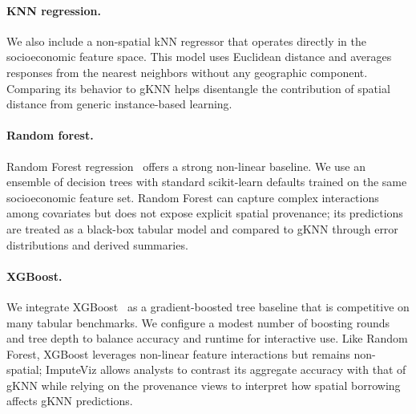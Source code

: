 \documentclass{egpubl}
\newcommand{\gknn}{gKNN\xspace}
\begin{document}
\paragraph*{KNN regression.}
We also include a non-spatial kNN regressor that operates directly in the socioeconomic feature space. This model uses Euclidean distance and averages responses from the nearest neighbors without any geographic component. Comparing its behavior to \gknn{} helps disentangle the contribution of spatial distance from generic instance-based learning.

\paragraph*{Random forest.}
Random Forest regression~\cite{Breiman2001RandomForest} offers a strong non-linear baseline. We use an ensemble of decision trees with standard scikit-learn defaults trained on the same socioeconomic feature set. Random Forest can capture complex interactions among covariates but does not expose explicit spatial provenance; its predictions are treated as a black-box tabular model and compared to \gknn{} through error distributions and derived summaries.

\paragraph*{XGBoost.}
We integrate XGBoost~\cite{Chen2016XGBoost} as a gradient-boosted tree baseline that is competitive on many tabular benchmarks. We configure a modest number of boosting rounds and tree depth to balance accuracy and runtime for interactive use. Like Random Forest, XGBoost leverages non-linear feature interactions but remains non-spatial; ImputeViz allows analysts to contrast its aggregate accuracy with that of \gknn{} while relying on the provenance views to interpret how spatial borrowing affects gKNN predictions.
\end{document}
